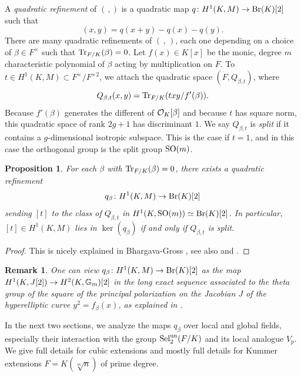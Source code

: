 \documentclass[11pt,a4paper]{amsart}
\def\G{{\rm \mathbb{G}}}
\def\O{{\rm \mathcal{O}}}
\def\un{{\rm un}}
\def\Tr{{\rm Tr}}
\def\Br{{\rm Br}}
\def\SO{{\rm SO}}
\def\Sel{{\rm Sel}}
\numberwithin{equation}{section}
\newtheorem{remark}[theorem]{Remark}
\newtheorem{proposition}[theorem]{Proposition}
\begin{document}
A {\it quadratic refinement} of $( \, , )$ is a quadratic map $q \colon H^1(K, M) \to \Br(K)[2]$ such that 
\[( x, y ) = q(x+y) - q(x) - q(y).\]
There are many quadratic refinements of $(\, ,\, )$, each one depending on a choice of $\beta \in F^\times$ such that $\Tr_{F/K}(\beta) = 0$. Let $f(x) \in K[x]$ be the monic, degree $m$ characteristic polynomial of $\beta$ acting by multiplication on $F$. To $t \in H^1(K, M) \subset F^\times/F^{\times2}$, we attach the quadratic space $(F, Q_{\beta,t})$, where 
\[Q_{\beta,t}(x,y)=\Tr_{F/K}(txy/f'(\beta)).\] Because $f'(\beta)$ generates the different of $\O_K[\beta]$ and because $t$ has square norm, this quadratic space of rank $2g+1$ has discriminant $1$. We say $Q_{\beta,t}$ is {\it split} if it contains a $g$-dimensional isotropic subspace. This is the case if $t = 1$, and in this case the orthogonal group is the split group $\SO(m)$.  

\begin{proposition}\label{prop: obstruction in terms of isotropy}
    For each $\beta$ with $\Tr_{F/K}(\beta) = 0$, there exists a quadratic refinement 
    \[q_\beta \colon H^1(K, M) \to \Br(K)[2]\] 
    sending $[t]$ to the class of $Q_{\beta, t}$ in $H^1(K, \SO(m)) \simeq \Br(K)[2]$. In particular,  $[t] \in H^1(K,M)$ lies in $\ker(q_\beta)$ if and only if $Q_{\beta,t}$ is split.  
\end{proposition}



\begin{proof}
    This is nicely explained in Bhargava-Gross \cite[\S4.2]{BhargavaGross2013}, see also \cite[\S6.2]{BhargavaGross2014} and \cite[Corollary 4.6]{PoonenRains}. 
\end{proof}

\begin{remark}\label{rem: connecting map}
    {\em 
    One can view $q_\beta \colon H^1(K,M) \to \Br(K)[2]$ as the map $H^1(K, J[2]) \to H^2(K, \G_m)[2]$ in the long exact sequence associated to the theta group of the square of the principal polarization on the Jacobian $J$ of the hyperelliptic curve $y^2 = f_\beta(x)$, as explained in \cite[\S4]{PoonenRains}. 
    }
\end{remark}

In the next two sections, we analyze the maps $q_\beta$  over local and global fields, especially their interaction with the group $\Sel_2^\un(F/K)$ and its local analogue $V_p$. We give full details for cubic extensions and mostly full details for Kummer extensions $F = K(\sqrt[m]{n})$ of prime degree. 
\end{document}
